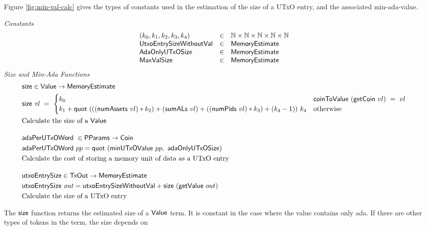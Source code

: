 Figure \ref{fig:min-val-calc} gives the types of constants used in the estimation
of the size of a UTxO entry, and the associated min-ada-value.

\begin{figure*}[h]
  \emph{Constants}
  \begin{equation*}
    \begin{array}{lcl}
      (k_0, k_1, k_2, k_3, k_4) & \in & \mathbb{N} \times \mathbb{N} \times \mathbb{N} \times \mathbb{N} \times \mathbb{N} \\
      \mathsf{UtxoEntrySizeWithoutVal} & \in & \mathsf{MemoryEstimate} \\
      \mathsf{AdaOnlyUTxOSize} & \in & \mathsf{MemoryEstimate} \\
      \mathsf{MaxValSize} & \in & \mathsf{MemoryEstimate} \\
    \end{array}
  \end{equation*}
  \emph{Size and Min-Ada Functions}
  \begin{align*}
    & \fun{size} \in \Value \to \MemoryEstimate \\
    & \fun{size}~\var{vl} ~=~
    \begin{cases}
      k_0 & \fun{coinToValue}~(\fun{getCoin}~vl)~=~vl \\
      k_1 + \fun{quot}~ (((\fun{numAssets}~vl) * k_2) + (\fun{sumALs}~vl) + ((\fun{numPids}~vl) * k_3) + (k_4 - 1))~k_4 & \text{otherwise} \\
    \end{cases} \\
    & \text{Calculate the size of a $\Value$}
    \nextdef
    & \fun{adaPerUTxOWord}~\in \PParams \to \Coin \\
    & \fun{adaPerUTxOWord}~pp = \fun{quot}~ (\fun{minUTxOValue}~pp,~ \mathsf{adaOnlyUTxOSize}) \\
    & \text{Calculate the cost of storing a memory unit of data as a UTxO entry}
    \nextdef
    & \fun{utxoEntrySize} \in \TxOut \to \MemoryEstimate \\
    & \fun{utxoEntrySize}~\var{out} = \mathsf{utxoEntrySizeWithoutVal} + \fun{size}~ (\fun{getValue}~out) \\
    & \text{Calculate the size of a UTxO entry}
\end{align*}
\caption{Value Size}
\label{fig:min-val-calc}
\end{figure*}

The $\mathsf{size}$ function returns the estimated size of a $\mathsf{Value}$ term. It is constant in the
case where the value contains only ada. If there are other types of tokens in the
term, the size depends on

